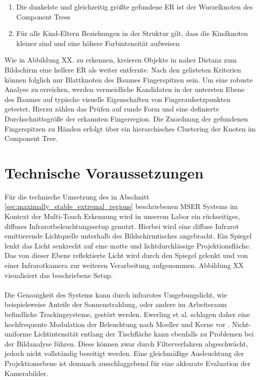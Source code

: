 \begin{enumerate}
\item Die dunkelste und gleichzeitig größte gefundene ER ist der Wurzelknoten des Component Trees
\item Für alle Kind-Eltern Beziehungen in der Struktur gilt, dass die Kindknoten kleiner sind und eine höhere Farbintensität aufweisen
\end{enumerate}

Wie in Abbildung XX. zu erkennen, kreieren Objekte in naher Distanz zum Bildschirm eine hellere ER als weiter entfernte. Nach den gelisteten Kriterien können folglich nur Blattknoten des Baumes Fingerspitzen sein. Um eine robuste Analyse zu erreichen, werden vermeidliche Kandidaten in der untersten Ebene des Baumes auf typische visuelle Eigenschaften von Fingeraufsetzpunkten getestet. Hierzu zählen das Prüfen auf runde Form und eine definierte Durchschnittsgröße der erkannten Fingerregion. Die Zuordnung der gefundenen Fingerspitzen zu Händen erfolgt über ein hierarchisches Clustering der Knoten im Component Tree.

\section{Technische Voraussetzungen}
\label{sec:technische_voraussetzungen}

Für die technische Umsetzung des in Abschnitt \ref{sec:maximally_stable_extremal_regions} beschriebenen MSER Systems im Kontext der Multi-Touch Erkennung wird in unserem Labor ein rückseitiges, diffuses Infrarotbeleuchtungssetup genutzt. Hierbei wird eine diffuse Infrarot emittierende Lichtquelle unterhalb des Bildschirmtisches angebracht. Ein Spiegel lenkt das Licht senkrecht auf eine matte und lichtdurchlässige Projektionsfläche. Das von dieser Ebene reflektierte Licht wird durch den Spiegel gelenkt und von einer Infrarotkamera zur weiteren Verarbeitung aufgenommen. Abbildung XX visualisiert das beschriebene Setup.
\\\\
Die Genauigkeit des Systems kann durch infrarotes Umgebungslicht, wie beispielsweise Anteile der Sonnenstrahlung, oder andere im Arbeitsraum befindliche Trackingsysteme, gestört werden. Ewerling et al. schlagen daher eine hochfrequente Modulation der Beleuchtung nach Moeller und Kerne vor \cite{ewerling:2012, moeller:2012}.  Nicht-uniforme Lichtintensität entlang der Tischfläche kann ebenfalls zu Problemen bei der Bildanalyse führen. Diese können zwar durch Filterverfahren abgeschwächt, jedoch nicht vollständig beseitigt werden. Eine gleichmäßige Ausleuchtung der Projektionsebene ist demnach ausschlaggebend für eine akkurate Evaluation der Kamerabilder.


